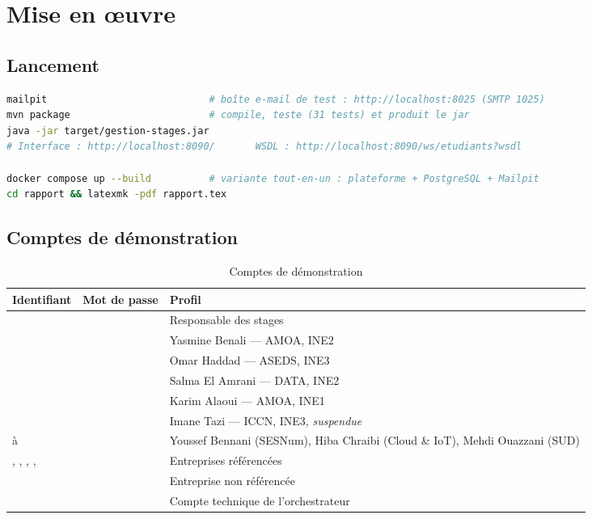 \chapter{Mise en œuvre}

\section{Lancement}
\begin{lstlisting}[language=sh]
mailpit                            # boîte e-mail de test : http://localhost:8025 (SMTP 1025)
mvn package                        # compile, teste (31 tests) et produit le jar
java -jar target/gestion-stages.jar
# Interface : http://localhost:8090/       WSDL : http://localhost:8090/ws/etudiants?wsdl

docker compose up --build          # variante tout-en-un : plateforme + PostgreSQL + Mailpit
cd rapport && latexmk -pdf rapport.tex
\end{lstlisting}

\section{Comptes de démonstration}\label{annexe:comptes}
\begin{table}[htbp]
\centering\small
\caption{Comptes de démonstration}
\begin{tabularx}{\textwidth}{@{}llY@{}}
\toprule
\textbf{Identifiant} & \textbf{Mot de passe} & \textbf{Profil} \\
\midrule
{} &  & Responsable des stages \\
 &  & Yasmine Benali — AMOA, INE2 \\
 &  & Omar Haddad — ASEDS, INE3 \\
 &  & Salma El Amrani — DATA, INE2 \\
 &  & Karim Alaoui — AMOA, INE1 \\
 &  & Imane Tazi — ICCN, INE3, \emph{suspendue} \\
 à  &  & Youssef Bennani (SESNum), Hiba Chraibi (Cloud \& IoT), Mehdi Ouazzani (SUD) \\
, , , ,  &  & Entreprises référencées \\
 &  & Entreprise non référencée \\
 &  & Compte technique de l'orchestrateur \\
\bottomrule
\end{tabularx}
\end{table}

